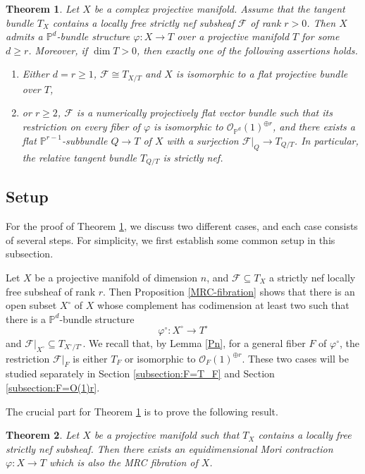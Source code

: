 \documentclass[english,reqno]{amsart}
\newcommand\bbP{{\mathbb P}}
\newcommand\sF{{\mathscr F}}
\newcommand\sO{{\mathscr O}}
\theoremstyle{plain}
\newtheorem{thm}{Theorem}[section]
\theoremstyle{definition}
\numberwithin{equation}{section} %
\begin{document}
\begin{thm}
	\label{cor:main:part1}
	Let $X$ be a  complex projective manifold. Assume that the tangent bundle $T_X$ contains a locally free strictly nef subsheaf $\sF$ of rank $r>0$.  Then $X$ admits a $\bbP^d$-bundle structure $\varphi\colon X\rightarrow T$ over a projective manifold $T$ for some $d\geq r$.
	Moreover, if $\dim T>0$, then exactly one of the following assertions holds.
	\begin{enumerate}
		\item Either $d=r\geq 1$, $\sF \cong T_{X/T}$ and $X$ is isomorphic to a flat projective bundle over $T$,
		\item or $r\geq 2$, $\sF$ is a numerically projectively flat vector bundle such that its restriction  on every fiber of $\varphi$ is  isomorphic to  $\sO_{\bbP^d}(1)^{\oplus r}$, and there exists a flat $\bbP^{r-1}$-subbundle $Q\rightarrow T$ of $X$ with a surjection $\sF\vert_Q\rightarrow T_{Q/T}$.  In particular, the relative tangent bundle $T_{Q/T}$ is strictly nef.
	\end{enumerate}
\end{thm}




\subsection{Setup}
\label{section:setup}


For the proof of Theorem \ref{cor:main:part1}, we  discuss two different cases, and each case consists  of several steps. For simplicity,  we  first establish some common setup in this subsection. 

Let $X$ be a projective manifold of dimension $n$, and $\sF \subseteq T_X$ a strictly nef locally free subsheaf of rank $r$. Then Proposition \ref{MRC-fibration} shows that there is an open subset $X^\circ$ of $X$ whose complement has codimension at least two such that there is a $\mathbb{P}^d$-bundle structure
$$
\varphi^\circ \colon X^\circ \to T^\circ
$$
and $\sF|_{X^\circ} \subseteq T_{X^\circ/T^\circ}$.  We recall that, by Lemma \ref{Pn}, for a general fiber $F$ of $\varphi^\circ$, the restriction $\sF|_F$ is either $T_F$ or isomorphic to $\sO_{F}(1)^{\oplus r}$. These two cases will be studied separately in Section \ref{subsection:F=T_F} and Section \ref{subsection:F=O(1)r}.  

The crucial part for Theorem \ref{cor:main:part1} is to prove the following result. 

\begin{thm}
	\label{lemma:Core-Technical-Theorem} Let $X$ be a projective manifold such that $T_X$ contains a locally
	free strictly nef  subsheaf.
	Then there exists an equidimensional Mori contraction $\varphi\colon X\rightarrow T$ which is also the MRC fibration of $X$.
\end{thm}
\end{document}
